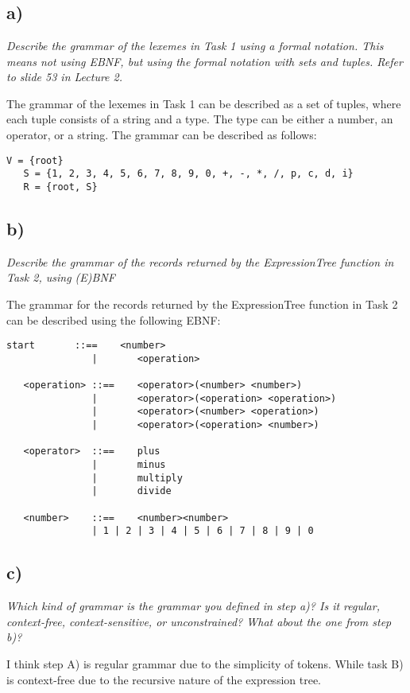 \documentclass[11pt,a4paper]{report}
\begin{document}
\clearpage

\section{}

\subsection{a)}
\textit{Describe the grammar of the lexemes in Task 1 using a formal notation. This means not using EBNF,
but using the formal notation with sets and tuples. Refer to slide 53 in Lecture 2.}


 The grammar of the lexemes in Task 1 can be described as a set of tuples, where each tuple consists of a string and a type. The type can be either a number, an operator, or a string. The grammar can be described as follows:
\begin{lstlisting}[mathescape,escapechar=\%]
   V = {root}
   S = {1, 2, 3, 4, 5, 6, 7, 8, 9, 0, +, -, *, /, p, c, d, i}
   R = {root, S}
   \end{lstlisting}

   \subsection{b)}
   \textit{Describe the grammar of the records returned by the ExpressionTree function in Task 2, using (E)BNF}
   
   The grammar for the records returned by the ExpressionTree function in Task 2 can be described using the following EBNF:
   \begin{lstlisting}[mathescape,escapechar=\%]
   start       ::==    <number> 
               |       <operation>
   
   <operation> ::==    <operator>(<number> <number>) 
               |       <operator>(<operation> <operation>) 
               |       <operator>(<number> <operation>) 
               |       <operator>(<operation> <number>)
   
   <operator>  ::==    plus 
               |       minus 
               |       multiply 
               |       divide
   
   <number>    ::==    <number><number>
               | 1 | 2 | 3 | 4 | 5 | 6 | 7 | 8 | 9 | 0
   \end{lstlisting}
   
   \subsection{c)}
   \textit{
   Which kind of grammar is the grammar you defined in step a)? Is it regular, context-free, context-sensitive, or unconstrained? What about the one from step b)?
   }

   I think step A) is regular grammar due to the simplicity of tokens. While task B) is context-free due to the recursive nature of the expression tree.
   
   
\end{document}
